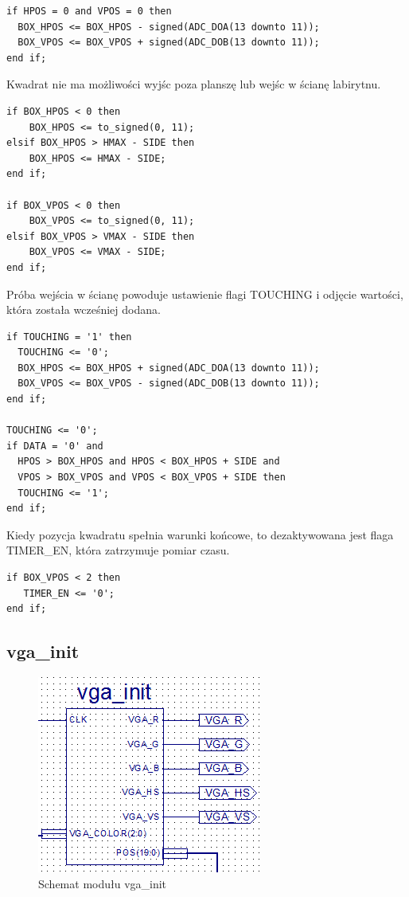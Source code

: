 \documentclass[11pt]{article}
\begin{document}
\begin{lstlisting}
if HPOS = 0 and VPOS = 0 then
  BOX_HPOS <= BOX_HPOS - signed(ADC_DOA(13 downto 11));
  BOX_VPOS <= BOX_VPOS + signed(ADC_DOB(13 downto 11));
end if;
\end{lstlisting}


Kwadrat nie ma możliwości wyjśc poza planszę lub wejśc w ścianę labirytnu.

\begin{lstlisting}
if BOX_HPOS < 0 then
    BOX_HPOS <= to_signed(0, 11);
elsif BOX_HPOS > HMAX - SIDE then
    BOX_HPOS <= HMAX - SIDE;
end if;

if BOX_VPOS < 0 then
    BOX_VPOS <= to_signed(0, 11);
elsif BOX_VPOS > VMAX - SIDE then
    BOX_VPOS <= VMAX - SIDE;
end if;
\end{lstlisting}

Próba wejścia w ścianę powoduje ustawienie flagi TOUCHING i odjęcie wartości, która została wcześniej dodana.

\begin{lstlisting}
if TOUCHING = '1' then
  TOUCHING <= '0';
  BOX_HPOS <= BOX_HPOS + signed(ADC_DOA(13 downto 11));
  BOX_VPOS <= BOX_VPOS - signed(ADC_DOB(13 downto 11));
end if;

TOUCHING <= '0';
if DATA = '0' and
  HPOS > BOX_HPOS and HPOS < BOX_HPOS + SIDE and 
  VPOS > BOX_VPOS and VPOS < BOX_VPOS + SIDE then
  TOUCHING <= '1';
end if;
\end{lstlisting}

Kiedy pozycja kwadratu spełnia warunki końcowe, to dezaktywowana jest flaga TIMER\_EN, która zatrzymuje pomiar czasu.

\begin{lstlisting}
if BOX_VPOS < 2 then
   TIMER_EN <= '0';
end if;
\end{lstlisting}



\subsection{vga\_init}

\begin{figure}[h!]
\center
\includegraphics[scale=1]{VGA_init.png}
\caption{Schemat modułu vga\_init}
\end{figure}
\end{document}
